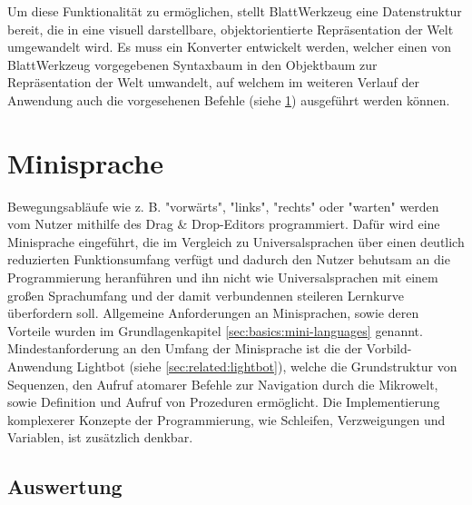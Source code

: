 
Um diese Funktionalität zu ermöglichen, stellt BlattWerkzeug eine Datenstruktur bereit, die in eine visuell darstellbare, objektorientierte Repräsentation der Welt umgewandelt wird. Es muss ein Konverter entwickelt werden, welcher einen von BlattWerkzeug vorgegebenen Syntaxbaum in den Objektbaum zur Repräsentation der Welt umwandelt, auf welchem im weiteren Verlauf der Anwendung auch die vorgesehenen Befehle (siehe \ref{sec:requirements:program}) ausgeführt werden können.

\section{Minisprache}
\label{sec:requirements:program}

Bewegungsabläufe wie z. B. "vorwärts", "links", "rechts" oder "warten" werden vom Nutzer mithilfe des Drag \& Drop-Editors programmiert. Dafür wird eine Minisprache eingeführt, die im Vergleich zu Universalsprachen über einen deutlich reduzierten Funktionsumfang verfügt und dadurch den Nutzer behutsam an die Programmierung heranführen und ihn nicht wie Universalsprachen mit einem großen Sprachumfang und der damit verbundennen steileren Lernkurve überfordern soll. Allgemeine Anforderungen an Minisprachen, sowie deren Vorteile wurden im Grundlagenkapitel \ref{sec:basics:mini-languages} genannt. Mindestanforderung an den Umfang der Minisprache ist die der Vorbild-Anwendung Lightbot (siehe \ref{sec:related:lightbot}), welche die Grundstruktur von Sequenzen, den Aufruf atomarer Befehle zur Navigation durch die Mikrowelt, sowie Definition und Aufruf von Prozeduren ermöglicht. Die Implementierung komplexerer Konzepte der Programmierung, wie Schleifen, Verzweigungen und Variablen, ist zusätzlich denkbar.

\subsection{Auswertung}
\label{sec:requirements:world:compile-interpret}

